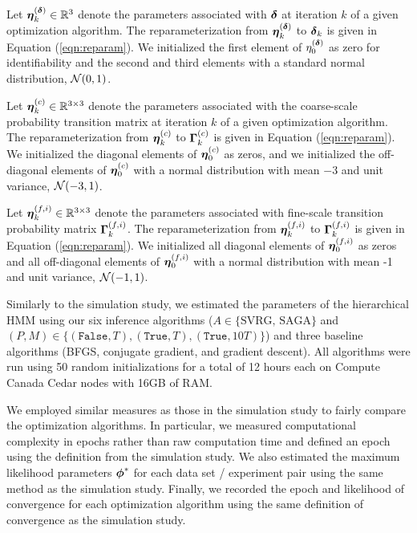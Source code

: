 Let $\boldsymbol{\eta}^{(\boldsymbol{\delta})}_k \in \mathbb{R}^3$ denote the parameters associated with $\boldsymbol{\delta}$ at iteration $k$ of a given optimization algorithm. The reparameterization from $\boldsymbol{\eta}^{(\boldsymbol{\delta})}_k$ to $\boldsymbol{\delta}_k$ is given in Equation (\ref{eqn:reparam}). We initialized the first element of $\eta^{(\boldsymbol{\delta})}_0$ as zero for identifiability and the second and third elements with a standard normal distribution, $\mathcal{N}(0,1)$.

Let $\boldsymbol{\eta}_k^{(c)} \in \mathbb{R}^{3 \times 3}$ denote the parameters associated with the coarse-scale probability transition matrix at iteration $k$ of a given optimization algorithm. The reparameterization from $\boldsymbol{\eta}_k^{(c)}$ to $\boldsymbol{\Gamma}_k^{(c)}$ is given in Equation (\ref{eqn:reparam}). We initialized the diagonal elements of $\boldsymbol{\eta}_0^{(c)}$ as zeros, and we initialized the off-diagonal elements of $\boldsymbol{\eta}_0^{(c)}$ with a normal distribution with mean $-3$ and unit variance, $\mathcal{N}(-3,1)$.

Let $\boldsymbol{\eta}_k^{(f,i)} \in \mathbb{R}^{3 \times 3}$ denote the parameters associated with fine-scale transition probability matrix $\boldsymbol{\Gamma}_k^{(f,i)}$. The reparameterization from $\boldsymbol{\eta}_k^{(f,i)}$ to $\boldsymbol{\Gamma}_k^{(f,i)}$ is given in Equation (\ref{eqn:reparam}). We initialized all diagonal elements of $\boldsymbol{\eta}_0^{(f,i)}$ as zeros and all off-diagonal elements of $\boldsymbol{\eta}_0^{(f,i)}$ with a normal distribution with mean -1 and unit variance, $\mathcal{N}(-1,1)$.

%
%
Similarly to the simulation study, we estimated the parameters of the hierarchical HMM using our six inference algorithms ($A \in \{\text{SVRG, SAGA}\}$ and $(P,M) \in \{(\texttt{False},T),(\texttt{True},T),(\texttt{True},10T)\}$) and three baseline algorithms (BFGS, conjugate gradient, and gradient descent). All algorithms were run using 50 random initializations for a total of 12 hours each on Compute Canada Cedar nodes with 16GB of RAM.

We employed similar measures as those in the simulation study to fairly compare the optimization algorithms. In particular, we measured computational complexity in epochs rather than raw computation time and defined an epoch using the definition from the simulation study. We also estimated the maximum likelihood parameters $\boldsymbol{\phi}^*$ for each data set / experiment pair using the same method as the simulation study. Finally, we recorded the epoch and likelihood of convergence for each optimization algorithm using the same definition of convergence as the simulation study.

